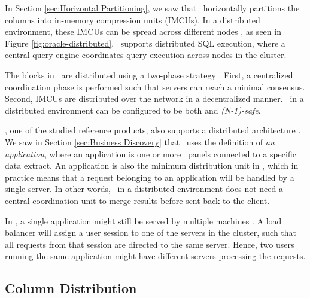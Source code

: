 In Section \ref{sec:Horizontal Partitioning}, we saw that \oracle~horizontally partitions the columns into in-memory compression units (IMCUs). In a distributed environment, these IMCUs can be spread across different nodes \cite{Mukherjee2015-ul}, as seen in Figure \ref{fig:oracle-distributed}. \oracle~supports distributed SQL execution, where a central query engine coordinates query execution across nodes in the cluster. 

The blocks in \oracle~are distributed using a two-phase strategy \cite{Mukherjee2015-ul}. First, a centralized coordination phase is performed such that servers can reach a minimal consensus. Second, IMCUs are distributed over the network in a decentralized manner. \oracle~in a distributed environment can be configured to be both  and \textit{(N-1)-safe}.

\qlikview, one of the studied reference products, also supports a distributed architecture \cite{Qlik2012-ku}. We saw in Section \ref{sec:Business Discovery} that \qlikview~uses the definition of \textit{an application}, where an application is one or more \bd~panels connected to a specific data extract. An application is also the minimum distribution unit in \qlikview, which in practice means that a request belonging to an application will be handled by a single server.  In other words, \qlikview~in a distributed environment does not need a central coordination unit to merge results before sent back to the client.

In \qlikview, a single application might still be served by multiple machines \cite{Qlik2012-ku}. A load balancer will assign a user session to one of the servers in the cluster, such that all requests from that session are directed to the same server. Hence, two users running the same application might have different servers processing the requests.

\subsection{Column Distribution}
\label{sub:Column Distribution}

